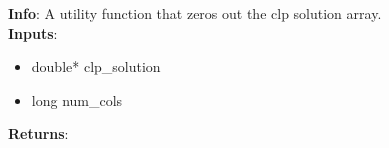 \textbf{Info}: A utility function that zeros out the clp solution array.\\

\noindent \textbf{Inputs}:
    \begin{itemize}
    \item{double* clp\_solution}
    \item{long num\_cols}
    \end{itemize}

\noindent \textbf{Returns}:
